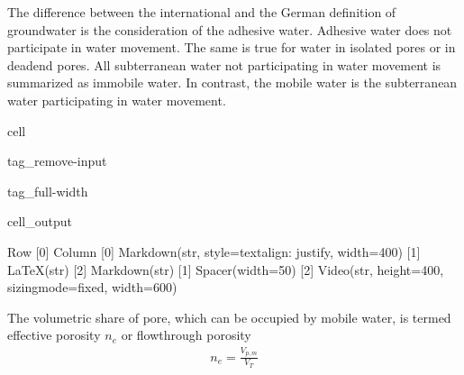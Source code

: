 \documentclass[letterpaper,10pt,english]{jupyterBook}
\let\sphinxpxdimen\pdfpxdimen\else\newdimen\sphinxpxdimen
\begin{document}
\noindent{\hspace*{\fill}\sphinxincludegraphics[width=600\sphinxpxdimen]{{L03_f_1}.png}\hspace*{\fill}}

\sphinxAtStartPar
The difference between the international and the German definition of groundwater is the consideration of the adhesive water. Adhesive water does not participate in water movement. The same is true for water in isolated pores or in dead\sphinxhyphen{}end pores. All subterranean water not participating in water movement is summarized as immobile water. In contrast, the mobile water is the subterranean water participating in water movement.

\begin{sphinxuseclass}{cell}
\begin{sphinxuseclass}{tag_remove-input}
\begin{sphinxuseclass}{tag_full-width}\begin{sphinxVerbatimOutput}

\begin{sphinxuseclass}{cell_output}
\begin{sphinxVerbatim}[commandchars=\\\{\}]
Row
    [0] Column
        [0] Markdown(str, style=\PYGZob{}\PYGZsq{}text\PYGZhy{}align\PYGZsq{}: \PYGZsq{}justify\PYGZsq{}\PYGZcb{}, width=400)
        [1] LaTeX(str)
        [2] Markdown(str)
    [1] Spacer(width=50)
    [2] Video(str, height=400, sizing\PYGZus{}mode=\PYGZsq{}fixed\PYGZsq{}, width=600)
\end{sphinxVerbatim}

\end{sphinxuseclass}\end{sphinxVerbatimOutput}

\end{sphinxuseclass}
\end{sphinxuseclass}
\end{sphinxuseclass}
\sphinxAtStartPar
The volumetric share of pore, which can be occupied by mobile water, is termed effective porosity \(n_e\) or flow\sphinxhyphen{}through porosity
\begin{equation*}
\begin{split}
n_e = \frac{V_{p, m}}{V_T}
\end{split}
\end{equation*}
\sphinxAtStartPar
\end{document}
